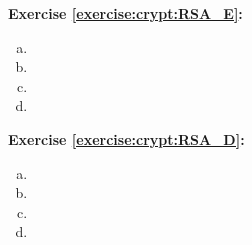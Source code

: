 \noindent\textbf{Exercise \ref{exercise:crypt:RSA_E}:}
% 
\begin{enumerate}[(a)]
  \item
 \item
 \item
\item
\end{enumerate}

 
\noindent\textbf{Exercise \ref{exercise:crypt:RSA_D}:}
% 
 \begin{enumerate}[(a)]
\item
 \item
 \item
 \item
 \end{enumerate}

 


